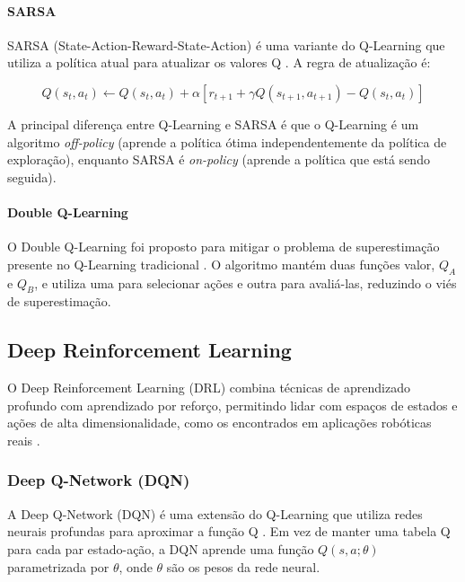 \paragraph{SARSA}

SARSA (State-Action-Reward-State-Action) é uma variante do Q-Learning que utiliza a política atual para atualizar os valores Q \cite{Rummery1994}. A regra de atualização é:

\begin{equation}
Q(s_t, a_t) \leftarrow Q(s_t, a_t) + \alpha [r_{t+1} + \gamma Q(s_{t+1}, a_{t+1}) - Q(s_t, a_t)]
\end{equation}

A principal diferença entre Q-Learning e SARSA é que o Q-Learning é um algoritmo \textit{off-policy} (aprende a política ótima independentemente da política de exploração), enquanto SARSA é \textit{on-policy} (aprende a política que está sendo seguida).

\paragraph{Double Q-Learning}

O Double Q-Learning foi proposto para mitigar o problema de superestimação presente no Q-Learning tradicional \cite{Hasselt2010}. O algoritmo mantém duas funções valor, $Q_A$ e $Q_B$, e utiliza uma para selecionar ações e outra para avaliá-las, reduzindo o viés de superestimação.

\subsection{Deep Reinforcement Learning}

O Deep Reinforcement Learning (DRL) combina técnicas de aprendizado profundo com aprendizado por reforço, permitindo lidar com espaços de estados e ações de alta dimensionalidade, como os encontrados em aplicações robóticas reais \cite{Arulkumaran2017DeepRL}.

\subsubsection{Deep Q-Network (DQN)}

A Deep Q-Network (DQN) é uma extensão do Q-Learning que utiliza redes neurais profundas para aproximar a função Q \cite{Mnih2015}. Em vez de manter uma tabela Q para cada par estado-ação, a DQN aprende uma função $Q(s, a; \theta)$ parametrizada por $\theta$, onde $\theta$ são os pesos da rede neural.


